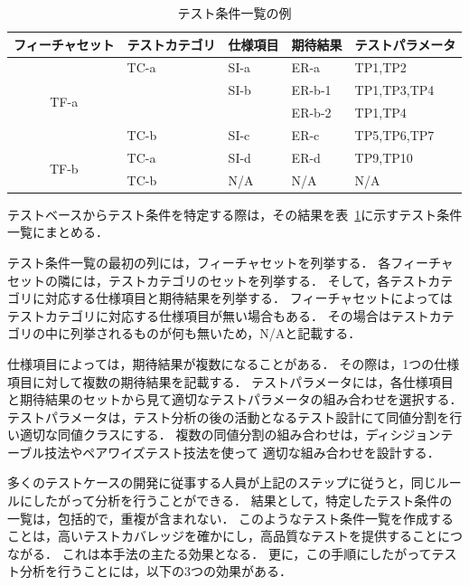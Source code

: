 \begin{table}[htbp]
  \centering
  \caption{テスト条件一覧の例}
    \begin{tabular}{|c|p{6.8em}|p{4em}|p{4em}|p{7.6em}|}
    \hline
    \multicolumn{1}{|p{7.6em}|}{フィーチャセット} & テストカテゴリ & 仕様項目 & 期待結果 & テストパラメータ \bigstrut \\
    \hline
    \hline
    \multicolumn{1}{|c|}{\multirow{4}[8]{*}{TF-a}} & TC-a  & SI-a  & ER-a  & TP1,TP2 \bigstrut\\
\cline{2-5}          & \multicolumn{1}{l|}{} & SI-b  & ER-b-1 & TP1,TP3,TP4 \bigstrut\\
\cline{2-5}          & \multicolumn{1}{l|}{} & \multicolumn{1}{l|}{} & ER-b-2 & TP1,TP4 \bigstrut\\
\cline{2-5}          & TC-b  & SI-c  & ER-c  & TP5,TP6,TP7 \bigstrut\\
    \hline
    \multicolumn{1}{|c|}{\multirow{2}[4]{*}{TF-b}} & TC-a  & SI-d  & ER-d  & TP9,TP10 \bigstrut\\
\cline{2-5}          & TC-b  & N/A   & N/A   & N/A \bigstrut\\
    \hline
    \end{tabular}%
  \label{tab:D-2testconditionliset}%
\end{table}%

テストベースからテスト条件を特定する際は，その結果を表~\ref{tab:D-2testconditionliset}に示すテスト条件一覧にまとめる．

テスト条件一覧の最初の列には，フィーチャセットを列挙する．
各フィーチャセットの隣には，テストカテゴリのセットを列挙する．
そして，各テストカテゴリに対応する仕様項目と期待結果を列挙する．
フィーチャセットによってはテストカテゴリに対応する仕様項目が無い場合もある．
その場合はテストカテゴリの中に列挙されるものが何も無いため，N/Aと記載する．


仕様項目によっては，期待結果が複数になることがある．
その際は，1つの仕様項目に対して複数の期待結果を記載する．
テストパラメータには，各仕様項目と期待結果のセットから見て適切なテストパラメータの組み合わせを選択する．
テストパラメータは，テスト分析の後の活動となるテスト設計にて同値分割を行い適切な同値クラスにする．
複数の同値分割の組み合わせは，ディシジョンテーブル技法やペアワイズテスト技法を使って
適切な組み合わせを設計する．

多くのテストケースの開発に従事する人員が上記のステップに従うと，同じルールにしたがって分析を行うことができる．
結果として，特定したテスト条件の一覧は，包括的で，重複が含まれない．
このようなテスト条件一覧を作成することは，高いテストカバレッジを確かにし，高品質なテストを提供することにつながる．
これは本手法の主たる効果となる．
更に，この手順にしたがってテスト分析を行うことには，以下の3つの効果がある．

